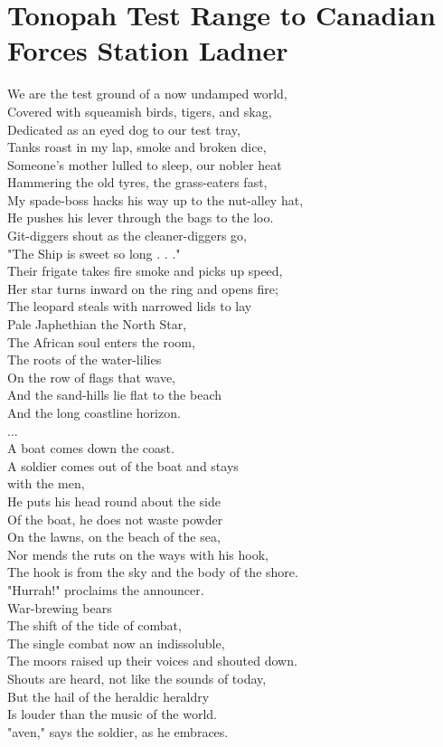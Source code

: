\documentclass[smalldemyvopaper,11pt,twoside,onecolumn,openright,extrafontsizes]{memoir}
\begin{document}
\chapter{Tonopah Test Range to Canadian Forces Station Ladner}
We are the test ground of a now undamped world,
\\Covered with squeamish birds, tigers, and skag,
\\Dedicated as an eyed dog to our test tray,
\\Tanks roast in my lap, smoke and broken dice,
\\Someone's mother lulled to sleep, our nobler heat
\\Hammering the old tyres, the grass-eaters fast,
\\My spade-boss hacks his way up to the nut-alley hat,
\\He pushes his lever through the bags to the loo.
\\Git-diggers shout as the cleaner-diggers go,
\\"The Ship is sweet so long . . ."
\\Their frigate takes fire smoke and picks up speed,
\\Her star turns inward on the ring and opens fire;
\\The leopard steals with narrowed lids to lay
\\Pale Japhethian the North Star,
\\The African soul enters the room,
\\The roots of the water-lilies
\\On the row of flags that wave,
\\And the sand-hills lie flat to the beach
\\And the long coastline horizon.
\\...
\\A boat comes down the coast.
\\A soldier comes out of the boat and stays
\\with the men,
\\He puts his head round about the side
\\Of the boat, he does not waste powder
\\On the lawns, on the beach of the sea,
\\Nor mends the ruts on the ways with his hook,
\\The hook is from the sky and the body of the shore.
\\"Hurrah!" proclaims the announcer.
\\War-brewing bears
\\The shift of the tide of combat,
\\The single combat now an indissoluble,
\\The moors raised up their voices and shouted down.
\\Shouts are heard, not like the sounds of today,
\\But the hail of the heraldic heraldry
\\Is louder than the music of the world.
\\"aven," says the soldier, as he embraces.
\end{document}

